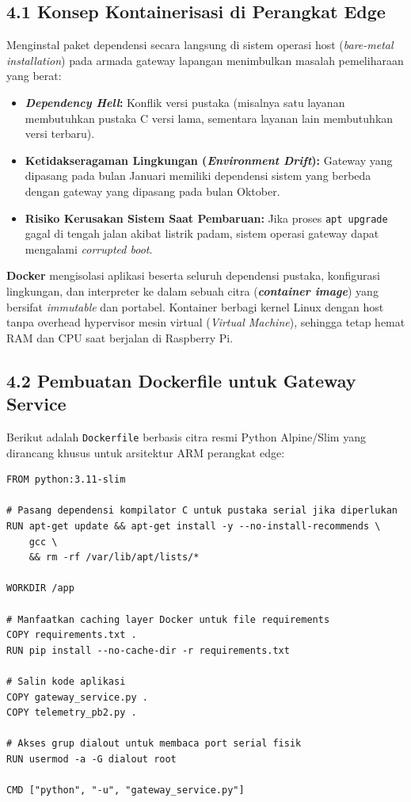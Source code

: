 \documentclass[11pt,a4paper]{article}
\begin{document}
\subsection*{4.1 Konsep Kontainerisasi di Perangkat Edge}
Menginstal paket dependensi secara langsung di sistem operasi host (\textit{bare-metal installation}) pada armada gateway lapangan menimbulkan masalah pemeliharaan yang berat:
\begin{itemize}
    \item \textbf{\textit{Dependency Hell}:} Konflik versi pustaka (misalnya satu layanan membutuhkan pustaka C versi lama, sementara layanan lain membutuhkan versi terbaru).
    \item \textbf{Ketidakseragaman Lingkungan (\textit{Environment Drift}):} Gateway yang dipasang pada bulan Januari memiliki dependensi sistem yang berbeda dengan gateway yang dipasang pada bulan Oktober.
    \item \textbf{Risiko Kerusakan Sistem Saat Pembaruan:} Jika proses \texttt{apt upgrade} gagal di tengah jalan akibat listrik padam, sistem operasi gateway dapat mengalami \textit{corrupted boot}.
\end{itemize}

\textbf{Docker} mengisolasi aplikasi beserta seluruh dependensi pustaka, konfigurasi lingkungan, dan interpreter ke dalam sebuah citra (\textbf{\textit{container image}}) yang bersifat \textit{immutable} dan portabel. Kontainer berbagi kernel Linux dengan host tanpa overhead hypervisor mesin virtual (\textit{Virtual Machine}), sehingga tetap hemat RAM dan CPU saat berjalan di Raspberry Pi.

\subsection*{4.2 Pembuatan Dockerfile untuk Gateway Service}
Berikut adalah \texttt{Dockerfile} berbasis citra resmi Python Alpine/Slim yang dirancang khusus untuk arsitektur ARM perangkat edge:

\begin{lstlisting}[style=iotcode, caption={Dockerfile untuk Edge Gateway Service (Dockerfile)}]
FROM python:3.11-slim

# Pasang dependensi kompilator C untuk pustaka serial jika diperlukan
RUN apt-get update && apt-get install -y --no-install-recommends \
    gcc \
    && rm -rf /var/lib/apt/lists/*

WORKDIR /app

# Manfaatkan caching layer Docker untuk file requirements
COPY requirements.txt .
RUN pip install --no-cache-dir -r requirements.txt

# Salin kode aplikasi
COPY gateway_service.py .
COPY telemetry_pb2.py .

# Akses grup dialout untuk membaca port serial fisik
RUN usermod -a -G dialout root

CMD ["python", "-u", "gateway_service.py"]
\end{lstlisting}
\end{document}
